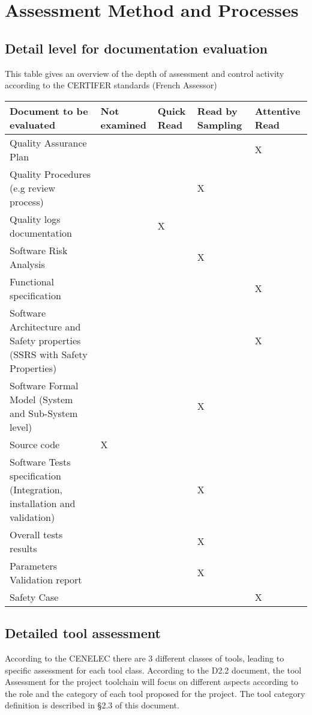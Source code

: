\documentclass{template/openetcs_article}
\begin{document}
\section{Assessment Method and Processes}

\subsection{Detail level for documentation evaluation}

This table gives an overview of the depth of assessment and control activity according to the CERTIFER standards (French Assessor)

\begin{tabular}{|p{5cm}|p{2cm}|p{2cm}|p{2cm}|p{2cm}|} 
\hline
\textbf{Document to be evaluated} & \textbf{Not examined} & \textbf{Quick Read} & \textbf{Read by Sampling} & \textbf{Attentive Read} \\ \hline
Quality Assurance Plan & & & & X \\ \hline
Quality Procedures (e.g review process) & & & X & \\ \hline
Quality logs documentation & & X & & \\ \hline
Software Risk Analysis & & & X & \\ \hline
Functional specification & & & & X \\ \hline
Software Architecture and Safety properties (SSRS with Safety Properties) & & & & X \\ \hline
Software Formal Model (System and Sub-System level) & & & X & \\ \hline
Source code & X & & & \\ \hline
Software Tests specification (Integration, installation and validation) & & & X & \\ \hline
Overall tests results & & & X & \\ \hline
Parameters Validation report & & & X & \\ \hline
Safety Case & & & & X \\ \hline
\end{tabular}

\subsection{Detailed tool assessment}
According to the CENELEC there are 3 different classes of tools, leading to specific assessment for each tool class. According to the D2.2 document, the tool
Assessment for the project toolchain will focus on different aspects according to the role and the category of each tool proposed for the project. The tool
category definition is described in \S 2.3 of this document.
\end{document}
